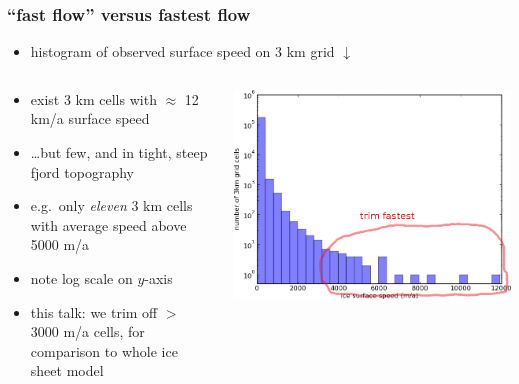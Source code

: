 \documentclass{beamer}
\begin{document}
\begin{frame}
  \frametitle{``fast flow'' versus fastest flow}

\begin{itemize}
\item histogram of observed surface speed on 3 km grid $\downarrow$
\end{itemize}

\begin{columns}
\begin{column}{0.4\textwidth}
\begin{itemize}
\item exist 3 km cells with $\approx$ 12 km/a surface speed
\item \dots but few, and in tight, steep fjord topography
\item \scriptsize e.g.~only \emph{eleven} 3 km cells with average speed above 5000 m/a
\item \normalsize note log scale on $y$-axis
\item this talk: we trim off $>$ 3000 m/a cells, for comparison to whole ice sheet model
\end{itemize}
\end{column}

\begin{column}{0.6\textwidth}
  \includegraphics[width=1.0\textwidth]{joughin_histogram_to12000_trim}
\end{column}
\end{columns}
\end{frame}
\end{document}
